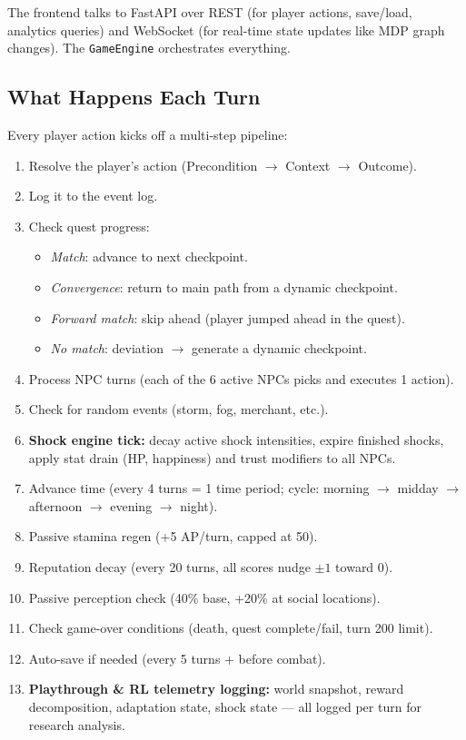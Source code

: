 The frontend talks to FastAPI over REST (for player actions, save/load, analytics queries) and WebSocket (for real-time state updates like MDP graph changes). The \texttt{GameEngine} orchestrates everything.

\subsection{What Happens Each Turn}

Every player action kicks off a multi-step pipeline:

\begin{enumerate}
    \item Resolve the player's action (Precondition $\to$ Context $\to$ Outcome).
    \item Log it to the event log.
    \item Check quest progress:
    \begin{itemize}
        \item \emph{Match}: advance to next checkpoint.
        \item \emph{Convergence}: return to main path from a dynamic checkpoint.
        \item \emph{Forward match}: skip ahead (player jumped ahead in the quest).
        \item \emph{No match}: deviation $\to$ generate a dynamic checkpoint.
    \end{itemize}
    \item Process NPC turns (each of the 6 active NPCs picks and executes 1 action).
    \item Check for random events (storm, fog, merchant, etc.).
    \item \textbf{Shock engine tick:} decay active shock intensities, expire finished shocks, apply stat drain (HP, happiness) and trust modifiers to all NPCs.
    \item Advance time (every 4 turns = 1 time period; cycle: morning $\to$ midday $\to$ afternoon $\to$ evening $\to$ night).
    \item Passive stamina regen (+5 AP/turn, capped at 50).
    \item Reputation decay (every 20 turns, all scores nudge $\pm 1$ toward 0).
    \item Passive perception check (40\% base, +20\% at social locations).
    \item Check game-over conditions (death, quest complete/fail, turn 200 limit).
    \item Auto-save if needed (every 5 turns + before combat).
    \item \textbf{Playthrough \& RL telemetry logging:} world snapshot, reward decomposition, adaptation state, shock state --- all logged per turn for research analysis.
\end{enumerate}

